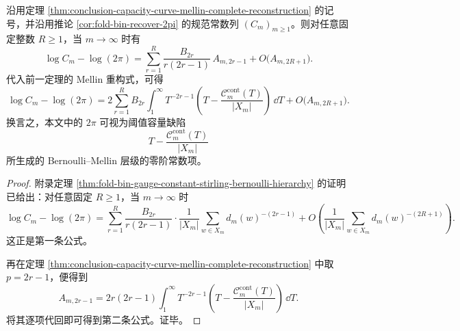 \begin{theorem}\label{thm:conclusion-foldpi-euler-mellin-translation}
沿用定理 \ref{thm:conclusion-capacity-curve-mellin-complete-reconstruction} 的记号，并沿用推论 \ref{cor:fold-bin-recover-2pi} 的规范常数列 \((C_m)_{m\ge 1}\)。则对任意固定整数 \(R\ge 1\)，当 \(m\to\infty\) 时有
\[
\log C_m-\log(2\pi)
=
\sum_{r=1}^{R}\frac{B_{2r}}{r(2r-1)}\,A_{m,2r-1}
+O\!\bigl(A_{m,2R+1}\bigr).
\]
代入前一定理的 Mellin 重构式，可得
\[
\log C_m-\log(2\pi)
=
2\sum_{r=1}^{R}B_{2r}
\int_{1}^{\infty}T^{-2r-1}
\left(
T-\frac{\mathcal C_m^{\mathrm{cont}}(T)}{|X_m|}
\right)\,\dd T
+O\!\bigl(A_{m,2R+1}\bigr).
\]
换言之，本文中的 \(2\pi\) 可视为阈值容量缺陷
\[
T-\frac{\mathcal C_m^{\mathrm{cont}}(T)}{|X_m|}
\]
所生成的 Bernoulli--Mellin 层级的零阶常数项。
\end{theorem}
\begin{proof}
附录定理 \ref{thm:fold-bin-gauge-constant-stirling-bernoulli-hierarchy} 的证明已给出：对任意固定 \(R\ge 1\)，当 \(m\to\infty\) 时
\[
\log C_m-\log(2\pi)
=
\sum_{r=1}^{R}
\frac{B_{2r}}{r(2r-1)}
\cdot
\frac{1}{|X_m|}\sum_{w\in X_m}d_m(w)^{-(2r-1)}
+O\!\left(
\frac{1}{|X_m|}
\sum_{w\in X_m}d_m(w)^{-(2R+1)}
\right).
\]
这正是第一条公式。

再在定理 \ref{thm:conclusion-capacity-curve-mellin-complete-reconstruction} 中取 \(p=2r-1\)，便得到
\[
A_{m,2r-1}
=
2r(2r-1)\int_1^\infty T^{-2r-1}
\left(
T-\frac{\mathcal C_m^{\mathrm{cont}}(T)}{|X_m|}
\right)\,\dd T.
\]
将其逐项代回即可得到第二条公式。证毕。
\end{proof}

